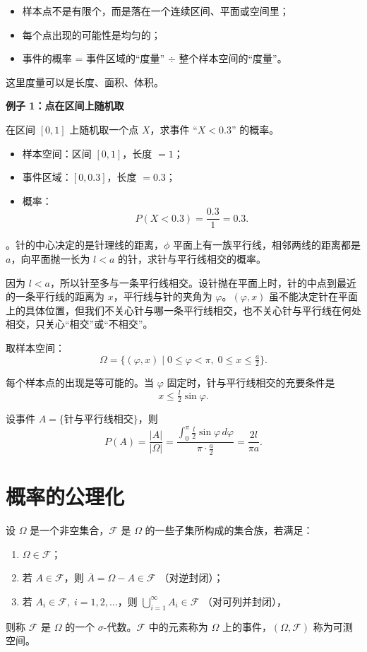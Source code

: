 \begin{itemize}
  \item 样本点不是有限个，而是落在一个连续区间、平面或空间里；
  \item 每个点出现的可能性是均匀的；
  \item 事件的概率 = 事件区域的“度量” $\div$ 整个样本空间的“度量”。
\end{itemize}
这里度量可以是长度、面积、体积。

\bigskip

\textbf{例子 1：点在区间上随机取}  

在区间 $[0,1]$ 上随机取一个点 $X$，求事件 “$X<0.3$” 的概率。
\begin{itemize}
  \item 样本空间：区间 $[0,1]$，长度 $=1$；
  \item 事件区域：$[0,0.3]$，长度 $=0.3$；
  \item 概率：
  \[
  P(X<0.3) = \frac{0.3}{1} = 0.3.
  \]
\end{itemize}
\begin{example}。针的中心决定的是针理线的距离，$\phi$
平面上有一族平行线，相邻两线的距离都是 $a$，向平面抛一长为 $l<a$ 的针，求针与平行线相交的概率。
\end{example}

\begin{solution}
因为 $l<a$，所以针至多与一条平行线相交。设针抛在平面上时，针的中点到最近的一条平行线的距离为 $x$，平行线与针的夹角为 $\varphi$。$(\varphi,x)$ 虽不能决定针在平面上的具体位置，但我们不关心针与哪一条平行线相交，也不关心针与平行线在何处相交，只关心“相交”或“不相交”。  

取样本空间：
\[
\Omega = \{(\varphi,x)\mid 0\le \varphi < \pi,\; 0\le x \le \tfrac{a}{2}\}.
\]

每个样本点的出现是等可能的。当 $\varphi$ 固定时，针与平行线相交的充要条件是
\[
x \le \tfrac{l}{2}\sin\varphi.
\]

设事件 $A=\{\text{针与平行线相交}\}$，则
\[
P(A) = \frac{|A|}{|\Omega|}
= \frac{\int_0^\pi \tfrac{l}{2}\sin\varphi \, d\varphi}{\pi \cdot \tfrac{a}{2}}
= \frac{2l}{\pi a}.
\]
\end{solution}
\section{概率的公理化}
\begin{definition}[1.3.1可测空间]
设 $\Omega$ 是一个非空集合，$\mathcal{F}$ 是 $\Omega$ 的一些子集所构成的集合族，若满足：
\begin{enumerate}
  \item $\Omega \in \mathcal{F}$；
  \item 若 $A \in \mathcal{F}$，则 $\overline{A} = \Omega - A \in \mathcal{F}$ （对逆封闭）；
  \item 若 $A_i \in \mathcal{F},\; i=1,2,\dots$，则 $\bigcup_{i=1}^\infty A_i \in \mathcal{F}$ （对可列并封闭），
\end{enumerate}
则称 $\mathcal{F}$ 是 $\Omega$ 的一个 $\sigma$-代数。$\mathcal{F}$ 中的元素称为 $\Omega$ 上的事件，$(\Omega,\mathcal{F})$ 称为可测空间。
\end{definition}

